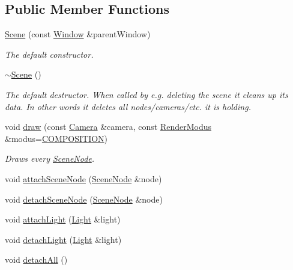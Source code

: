\subsection*{Public Member Functions}
\begin{DoxyCompactItemize}
\item 
\hyperlink{classburn_1_1_scene_a14bb493f34a5c489f2460b94698c8f72}{Scene} (const \hyperlink{classburn_1_1_window}{Window} \&parent\-Window)
\begin{DoxyCompactList}\small\item\em The default constructor. \end{DoxyCompactList}\item 
\hyperlink{classburn_1_1_scene_a7722cda0111bd22ca193174326e66924}{$\sim$\-Scene} ()
\begin{DoxyCompactList}\small\item\em The default destructor. When called by e.\-g. deleting the scene it cleans up its data. In other words it deletes all nodes/cameras/etc. it is holding. \end{DoxyCompactList}\item 
void \hyperlink{classburn_1_1_scene_aca5f35cf0478da8ac4bc79975610ed65}{draw} (const \hyperlink{classburn_1_1_camera}{Camera} \&camera, const \hyperlink{classburn_1_1_scene_a992349a23199d694dca7b8cbd4957299}{Render\-Modus} \&modus=\hyperlink{classburn_1_1_scene_a992349a23199d694dca7b8cbd4957299a9de887ba3d66505de29d661ec0cb0c63}{C\-O\-M\-P\-O\-S\-I\-T\-I\-O\-N})
\begin{DoxyCompactList}\small\item\em Draws every \hyperlink{classburn_1_1_scene_node}{Scene\-Node}. \end{DoxyCompactList}\item 
void \hyperlink{classburn_1_1_scene_aa013e68565bda374fa704f816d8e6847}{attach\-Scene\-Node} (\hyperlink{classburn_1_1_scene_node}{Scene\-Node} \&node)
\item 
void \hyperlink{classburn_1_1_scene_a999ba40b417a1074b58c73e837170e51}{detach\-Scene\-Node} (\hyperlink{classburn_1_1_scene_node}{Scene\-Node} \&node)
\item 
void \hyperlink{classburn_1_1_scene_a32378fec20f95d1ed972869e0a4a5b20}{attach\-Light} (\hyperlink{classburn_1_1_light}{Light} \&light)
\item 
void \hyperlink{classburn_1_1_scene_a6e8c366da48a859641a08d82ac4b293d}{detach\-Light} (\hyperlink{classburn_1_1_light}{Light} \&light)
\item 
void \hyperlink{classburn_1_1_scene_a8d4c2bc5288fed85613b59f68e05e96c}{detach\-All} ()

\end{DoxyCompactItemize}
